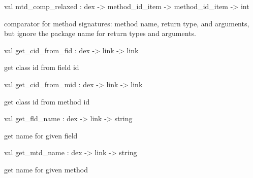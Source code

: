\documentclass[11pt]{article}
\begin{document}
\label{val:Dex.mtd-underscorecomp-underscorerelaxed}\begin{ocamldoccode}
val mtd_comp_relaxed : dex -> method_id_item -> method_id_item -> int
\end{ocamldoccode}
\begin{ocamldocdescription}
comparator for method signatures: method name, return type, and arguments,
  but ignore the package name for return types and arguments.


\end{ocamldocdescription}




\label{val:Dex.get-underscorecid-underscorefrom-underscorefid}\begin{ocamldoccode}
val get_cid_from_fid : dex -> link -> link
\end{ocamldoccode}
\begin{ocamldocdescription}
get class id from field id


\end{ocamldocdescription}




\label{val:Dex.get-underscorecid-underscorefrom-underscoremid}\begin{ocamldoccode}
val get_cid_from_mid : dex -> link -> link
\end{ocamldoccode}
\begin{ocamldocdescription}
get class id from method id


\end{ocamldocdescription}




\label{val:Dex.get-underscorefld-underscorename}\begin{ocamldoccode}
val get_fld_name : dex -> link -> string
\end{ocamldoccode}
\begin{ocamldocdescription}
get name for given field


\end{ocamldocdescription}




\label{val:Dex.get-underscoremtd-underscorename}\begin{ocamldoccode}
val get_mtd_name : dex -> link -> string
\end{ocamldoccode}
\begin{ocamldocdescription}
get name for given method


\end{ocamldocdescription}
\end{document}
